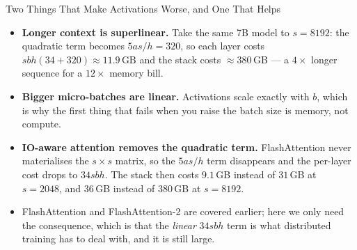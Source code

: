 \begin{frame}{Two Things That Make Activations Worse, and One That Helps}
  \begin{itemize}\itemsep0.4em
    \item[\textcolor{red}{$\blacktriangleright$}] \textbf{Longer context is superlinear.} Take the same 7B model to $s = 8192$: the quadratic term becomes $5as/h = 320$, so each layer costs $sbh(34+320) \approx 11.9$\,GB and the stack costs $\approx 380$\,GB --- a $4\times$ longer sequence for a $12\times$ memory bill.
    \item[\textcolor{red}{$\blacktriangleright$}] \textbf{Bigger micro-batches are linear.} Activations scale exactly with $b$, which is why the first thing that fails when you raise the batch size is memory, not compute.
    \item[\textcolor{red}{$\blacktriangleright$}] \textbf{IO-aware attention removes the quadratic term.} FlashAttention never materialises the $s \times s$ matrix, so the $5as/h$ term disappears and the per-layer cost drops to $34sbh$. The stack then costs $9.1$\,GB instead of $31$\,GB at $s = 2048$, and $36$\,GB instead of $380$\,GB at $s = 8192$.
    \item[\textcolor{red}{$\blacktriangleright$}] FlashAttention and FlashAttention-2 are covered earlier; here we only need the consequence, which is that the \emph{linear} $34sbh$ term is what distributed training has to deal with, and it is still large.
  \end{itemize}
\end{frame}


